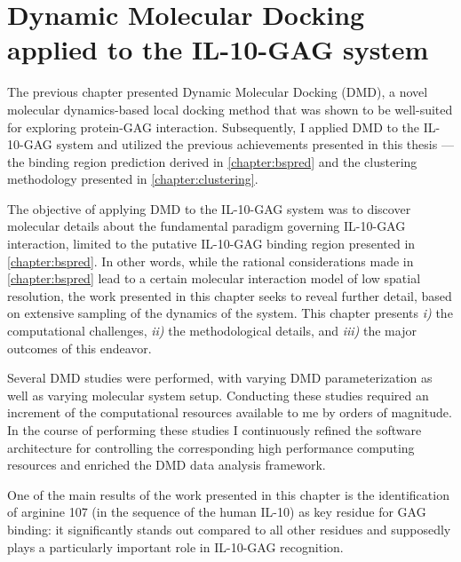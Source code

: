 \chapter{Dynamic Molecular Docking applied to the IL-10-GAG system}
\label{chapter:dmdil10}

The previous chapter presented Dynamic Molecular Docking (DMD), a novel
molecular dynamics-based local docking method that was shown to be well-suited
for exploring protein-GAG interaction. Subsequently, I applied DMD to the
IL-10-GAG system and utilized the previous achievements presented in this thesis
--- the binding region prediction derived in \cref{chapter:bspred} and the
clustering methodology presented in \cref{chapter:clustering}.

The objective of applying DMD to the IL-10-GAG system was to discover molecular
details about the fundamental paradigm governing IL-10-GAG interaction, limited
to the putative IL-10-GAG binding region presented in \cref{chapter:bspred}. In
other words, while the rational considerations made in \cref{chapter:bspred}
lead to a certain molecular interaction model of low spatial resolution, the
work presented in this chapter seeks to reveal further detail, based on
extensive sampling of the dynamics of the system. This chapter presents
\textit{i)} the computational challenges, \textit{ii)} the methodological
details, and \textit{iii)} the major outcomes of this endeavor.

Several DMD studies were performed, with varying DMD parameterization as well as
varying molecular system setup. Conducting these studies required an increment
of the computational resources available to me by orders of magnitude. In the
course of performing these studies I continuously refined the software
architecture for controlling the corresponding high performance computing
resources and enriched the DMD data analysis framework.

One of the main results of the work presented in this chapter is the
identification of arginine 107 (in the sequence of the human IL-10) as key
residue for GAG binding: it significantly stands out compared to all other
residues and supposedly plays a particularly important role in IL-10-GAG
recognition.


